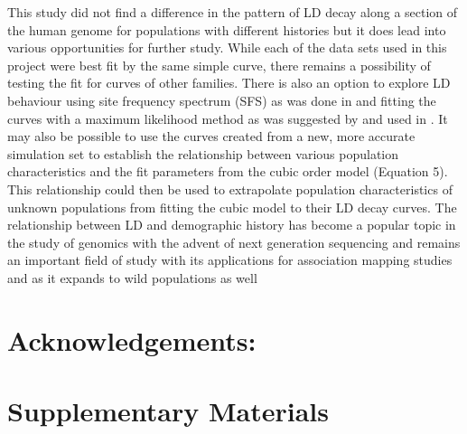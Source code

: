 \documentclass[11pt]{article}
\begin{document}
\begin{linenumbers}
This study did not find a difference in the pattern of LD decay along a section of the human genome for populations with different histories but it does lead into various opportunities for further study. While each of the data sets used in this project were best fit by the same simple curve, there remains a possibility of testing the fit for curves of other families. There is also an option to explore LD behaviour using site frequency spectrum (SFS) as was done in \cite{gray2009linkage} and fitting the curves with a maximum likelihood method as was suggested by \cite{park2012linkage} and used in \cite{hernandez2007demographic}. It may also be possible to use the curves created from a new, more accurate simulation set to establish the relationship between various population characteristics and the fit parameters from the cubic order model (Equation 5). This relationship could then be used to extrapolate population characteristics of unknown populations from fitting the cubic model to their LD decay curves. The relationship between LD and demographic history has become a popular topic in the study of genomics with the advent of next generation sequencing and remains an important field of study with its applications for association mapping studies and as it expands to wild populations as well \citep{slate2007admixture, gray2009linkage} 

\section{Acknowledgements:}

\end{linenumbers}

\newpage


\newpage
\section{Supplementary Materials}
\end{document}

